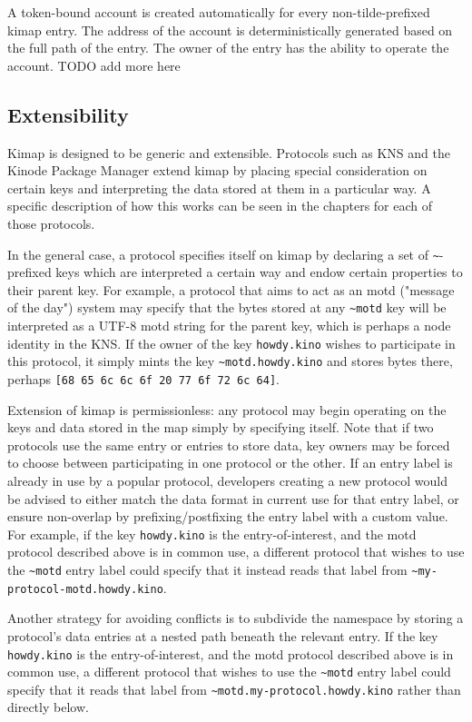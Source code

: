 \documentclass[runningheads]{llncs}
\begin{document}
A token-bound account is created automatically for every non-tilde-prefixed kimap entry.
The address of the account is deterministically generated based on the full path of the entry.
The owner of the entry has the ability to operate the account.
TODO add more here

\subsection{Extensibility}
\label{sec:extensibility}

Kimap is designed to be generic and extensible.
Protocols such as KNS and the Kinode Package Manager extend kimap by placing special consideration on certain keys and interpreting the data stored at them in a particular way.
A specific description of how this works can be seen in the chapters for each of those protocols.

In the general case, a protocol specifies itself on kimap by declaring a set of \verb|~|-prefixed keys which are interpreted a certain way and endow certain properties to their parent key. For example, a protocol that aims to act as an motd ("message of the day") system may specify that the bytes stored at any \verb|~motd| key will be interpreted as a UTF-8 motd string for the parent key, which is perhaps a node identity in the KNS. If the owner of the key \verb|howdy.kino| wishes to participate in this protocol, it simply mints the key \verb|~motd.howdy.kino| and stores bytes there, perhaps \verb|[68 65 6c 6c 6f 20 77 6f 72 6c 64]|.

Extension of kimap is permissionless: any protocol may begin operating on the keys and data stored in the map simply by specifying itself.
Note that if two protocols use the same entry or entries to store data, key owners may be forced to choose between participating in one protocol or the other.
If an entry label is already in use by a popular protocol, developers creating a new protocol would be advised to either match the data format in current use for that entry label, or ensure non-overlap by prefixing/postfixing the entry label with a custom value.
For example, if the key \verb|howdy.kino| is the entry-of-interest, and the motd protocol described above is in common use, a different protocol that wishes to use the \verb|~motd| entry label could specify that it instead reads that label from \verb|~my-protocol-motd.howdy.kino|.

Another strategy for avoiding conflicts is to subdivide the namespace by storing a protocol's data entries at a nested path beneath the relevant entry.
If the key \verb|howdy.kino| is the entry-of-interest, and the motd protocol described above is in common use, a different protocol that wishes to use the \verb|~motd| entry label could specify that it reads that label from \verb|~motd.my-protocol.howdy.kino| rather than directly below.
\end{document}
